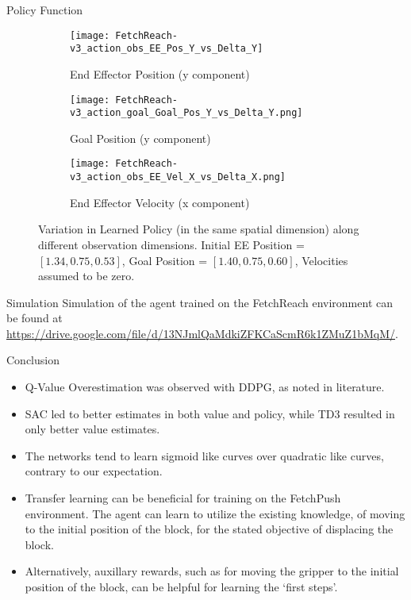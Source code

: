 \begin{frame}{Policy Function}
    \begin{figure}
        \centering
        \begin{subfigure}{0.33\textwidth}
            \centering
            \texttt{[image: FetchReach-v3\_action\_obs\_EE\_Pos\_Y\_vs\_Delta\_Y]}
            \caption{End Effector Position (y component)}
        \end{subfigure}
        \begin{subfigure}{0.33\textwidth}
            \centering
            \texttt{[image: FetchReach-v3\_action\_goal\_Goal\_Pos\_Y\_vs\_Delta\_Y.png]}
            \caption{Goal Position (y component)}
        \end{subfigure}
        \begin{subfigure}{0.33\textwidth}
            \centering
            \texttt{[image: FetchReach-v3\_action\_obs\_EE\_Vel\_X\_vs\_Delta\_X.png]}
            \caption{End Effector Velocity (x component)}
        \end{subfigure}
        \caption{Variation in Learned Policy (in the same spatial dimension) along different observation dimensions. Initial EE Position = $[1.34, 0.75, 0.53]$, Goal Position = $[1.40, 0.75, 0.60]$, Velocities assumed to be zero.}
    \end{figure}
\end{frame}

\begin{frame}{Simulation}
    Simulation of the agent trained on the FetchReach environment can be found at \url{https://drive.google.com/file/d/13NJmlQaMdkiZFKCaScmR6k1ZMuZ1bMqM/}.
\end{frame}

\begin{frame}{Conclusion}
    \begin{itemize}
        \item Q-Value Overestimation was observed with DDPG, as noted in literature.
        \item SAC led to better estimates in both value and policy, while TD3 resulted in only better value estimates.
        \item The networks tend to learn sigmoid like curves over quadratic like curves, contrary to our expectation.
        \item Transfer learning can be beneficial for training on the FetchPush environment. The agent can learn to utilize the existing knowledge, of moving to the initial position of the block, for the stated objective of displacing the block.
        \item Alternatively, auxillary rewards, such as for moving the gripper to the initial position of the block, can be helpful for learning the `first steps'.
    \end{itemize}
\end{frame}
